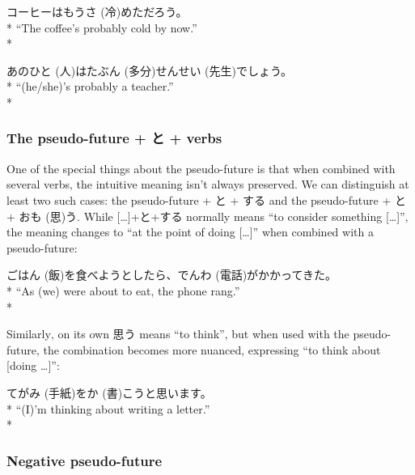 \documentclass[11pt, b5paper, twoside, openright, onecolumn]{book}
\makeatletter
\newcommand*{\rubystack}[2]{{\relscale{0.5}%
  \begin{tabular}[b]{@{}c@{}}%
    {#1}\\%
   {\textscale{2}{#2}}%
  \end{tabular}}%
}
\DeclareRobustCommand*{\ruby}[2]{%
  \mbox{%
    \setlength{\parskip}{0ex}%
    \BeginAccSupp{method=pdfstringdef,ActualText={#1}}%
      \rubystack{\phantom{#2}}{#1}%
      \llap{%
        \rubystack{#2}{\phantom{#1}}%
      }%
    \EndAccSupp{}%
  }%
}
\renewcommand*{\ruby}[2]{#2 (#1)}%
\newenvironment{exampleblock}{
\setlength{\parindent}{0.6in}
\begin{minipage}[t]{\dimexpr\textwidth-\parindent}}
{\end{minipage}}
\makeatother
\begin{document}
\vspace{0.4cm}
\begin{exampleblock}
コーヒーはもう\ruby{冷}{さ}めただろう。 \\* 
“The coffee’s probably cold by now.” \\* 
\end{exampleblock}
\vspace{0.2cm}

\begin{exampleblock}
あの\ruby{人}{ひと}は\ruby{多分}{たぶん}\ruby{先生}{せんせい}でしょう。 \\* 
“(he/she)’s probably a teacher.” \\* 
\end{exampleblock}
\subsubsection{The pseudo-future + と + verbs}


One of the special things about the pseudo-future is that when combined with several verbs‚ the intuitive meaning isn’t always preserved. We can distinguish at least two such cases: the pseudo-future + と + する and the pseudo-future + と + \ruby{思}{おも}う. While […]+と+する normally means “to consider something […]”‚ the meaning changes to “at the point of doing […]” when combined with a pseudo-future:

\vspace{0.4cm}
\begin{exampleblock}
ご\ruby{飯}{はん}を食べようとしたら、\ruby{電話}{でんわ}がかかってきた。 \\* 
“As (we) were about to eat‚ the phone rang.” \\* 
\end{exampleblock}
\vspace{0.2cm}

Similarly‚ on its own 思う means “to think”‚ but when used with the pseudo-future‚ the combination becomes more nuanced‚ expressing “to think about [doing …]”:

\vspace{0.4cm}
\begin{exampleblock}
\ruby{手紙}{てがみ}を\ruby{書}{か}こうと思います。 \\* 
“(I)’m thinking about writing a letter.” \\* 
\end{exampleblock}
\subsubsection{Negative pseudo-future}
\end{document}
